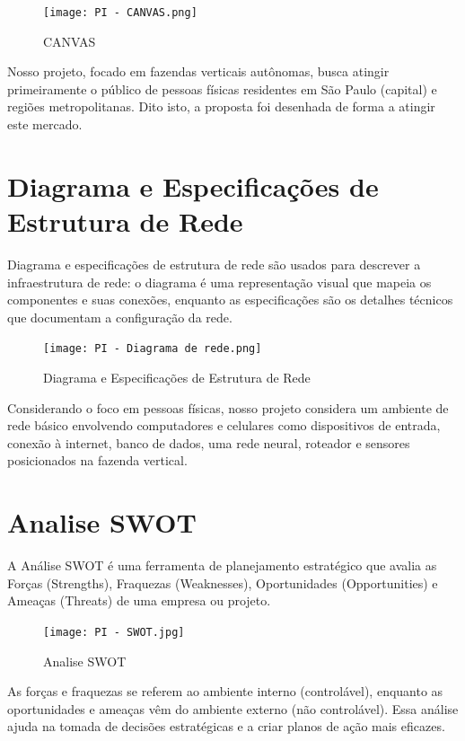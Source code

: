 \documentclass[
  a4paper,
  12pt,
  english,
  brazilian,
]{article}
\begin{document}
\begin{figure}[H] %
\centering
\caption{CANVAS}
\texttt{[image: PI - CANVAS.png]}
\end{figure}

Nosso projeto, focado em fazendas verticais autônomas, busca atingir primeiramente o público de pessoas físicas residentes em São Paulo (capital) e regiões metropolitanas. Dito isto, a proposta foi desenhada de forma a atingir este mercado.

\section*{Diagrama e Especificações de Estrutura de Rede}
Diagrama e especificações de estrutura de rede são usados para descrever a infraestrutura de rede: o diagrama é uma representação visual que mapeia os componentes e suas conexões, enquanto as especificações são os detalhes técnicos que documentam a configuração da rede.

\begin{figure}[H] %
\centering
\caption{Diagrama e Especificações de Estrutura de Rede}
\texttt{[image: PI - Diagrama de rede.png]}
\end{figure}

Considerando o foco em pessoas físicas, nosso projeto considera um ambiente de rede básico envolvendo computadores e celulares como dispositivos de entrada, conexão à internet, banco de dados, uma rede neural, roteador e sensores posicionados na fazenda vertical.

\section*{Analise SWOT}
A Análise SWOT é uma ferramenta de planejamento estratégico que avalia as Forças (Strengths), Fraquezas (Weaknesses), Oportunidades (Opportunities) e Ameaças (Threats) de uma empresa ou projeto.

\begin{figure}[H] %
\centering
\caption{Analise SWOT}
\texttt{[image: PI - SWOT.jpg]}
\end{figure}

As forças e fraquezas se referem ao ambiente interno (controlável), enquanto as oportunidades e ameaças vêm do ambiente externo (não controlável). Essa análise ajuda na tomada de decisões estratégicas e a criar planos de ação mais eficazes. 
\end{document}
